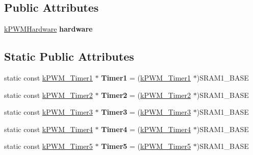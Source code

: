 \subsection*{Public Attributes}
\begin{DoxyCompactItemize}
\item 
\hyperlink{classkPWM_1_1kPWMHardware}{k\+P\+W\+M\+Hardware} {\bfseries hardware}\hypertarget{classkPWM_a66cc0314db7a2e743503aaf1f4dbc4b2}{}\label{classkPWM_a66cc0314db7a2e743503aaf1f4dbc4b2}

\end{DoxyCompactItemize}
\subsection*{Static Public Attributes}
\begin{DoxyCompactItemize}
\item 
static const \hyperlink{structkPWM__Timer1}{k\+P\+W\+M\+\_\+\+Timer1} $\ast$ {\bfseries Timer1} = (\hyperlink{structkPWM__Timer1}{k\+P\+W\+M\+\_\+\+Timer1} $\ast$)S\+R\+A\+M1\+\_\+\+B\+A\+SE\hypertarget{classkPWM_a04e0db3d7f1cbc7d06e89eed939b85cf}{}\label{classkPWM_a04e0db3d7f1cbc7d06e89eed939b85cf}

\item 
static const \hyperlink{structkPWM__Timer2}{k\+P\+W\+M\+\_\+\+Timer2} $\ast$ {\bfseries Timer2} = (\hyperlink{structkPWM__Timer2}{k\+P\+W\+M\+\_\+\+Timer2} $\ast$)S\+R\+A\+M1\+\_\+\+B\+A\+SE\hypertarget{classkPWM_ab30cc9d54138665c5b2d5f2790e9bdc7}{}\label{classkPWM_ab30cc9d54138665c5b2d5f2790e9bdc7}

\item 
static const \hyperlink{structkPWM__Timer3}{k\+P\+W\+M\+\_\+\+Timer3} $\ast$ {\bfseries Timer3} = (\hyperlink{structkPWM__Timer3}{k\+P\+W\+M\+\_\+\+Timer3} $\ast$)S\+R\+A\+M1\+\_\+\+B\+A\+SE\hypertarget{classkPWM_ab2ce1e6f24f870ec01adc7e1f3e963fc}{}\label{classkPWM_ab2ce1e6f24f870ec01adc7e1f3e963fc}

\item 
static const \hyperlink{structkPWM__Timer4}{k\+P\+W\+M\+\_\+\+Timer4} $\ast$ {\bfseries Timer4} = (\hyperlink{structkPWM__Timer4}{k\+P\+W\+M\+\_\+\+Timer4} $\ast$)S\+R\+A\+M1\+\_\+\+B\+A\+SE\hypertarget{classkPWM_a537d4a31158eb6320ed77615b539a088}{}\label{classkPWM_a537d4a31158eb6320ed77615b539a088}

\item 
static const \hyperlink{structkPWM__Timer5}{k\+P\+W\+M\+\_\+\+Timer5} $\ast$ {\bfseries Timer5} = (\hyperlink{structkPWM__Timer5}{k\+P\+W\+M\+\_\+\+Timer5} $\ast$)S\+R\+A\+M1\+\_\+\+B\+A\+SE\hypertarget{classkPWM_a8f94351d2b498ce8460d998b4845feb9}{}\label{classkPWM_a8f94351d2b498ce8460d998b4845feb9}


\end{DoxyCompactItemize}
